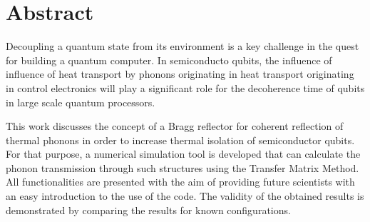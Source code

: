 \chapter*{Abstract}
Decoupling a quantum state from its environment is a key challenge in the quest
for building a quantum computer. 
In semiconducto qubits, the influence of  influence of heat transport by phonons 
originating in  heat
transport originating in control electronics will play a significant role for
the decoherence time of qubits in large scale quantum processors.

This work discusses the concept of a Bragg reflector for coherent
reflection of thermal phonons in order to increase thermal isolation of
semiconductor qubits. For that purpose, a numerical simulation tool is developed
that
can calculate the phonon transmission through such structures using
 the Transfer Matrix Method.
All functionalities are presented with the aim of providing future scientists
with an easy introduction to the use of the code.
The validity of the obtained results is demonstrated by comparing
the results for known configurations.